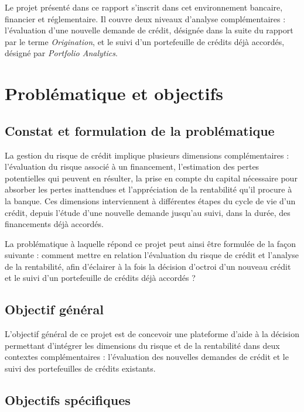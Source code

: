 Le projet présenté dans ce rapport s'inscrit dans cet environnement bancaire, financier et réglementaire. Il couvre deux niveaux d'analyse complémentaires : l'évaluation d'une nouvelle demande de crédit, désignée dans la suite du rapport par le terme \emph{Origination}, et le suivi d'un portefeuille de crédits déjà accordés, désigné par \emph{Portfolio Analytics}.

\section{Problématique et objectifs}

\subsection{Constat et formulation de la problématique}

La gestion du risque de crédit implique plusieurs dimensions complémentaires : l'évaluation du risque associé à un financement, l'estimation des pertes potentielles qui peuvent en résulter, la prise en compte du capital nécessaire pour absorber les pertes inattendues et l'appréciation de la rentabilité qu'il procure à la banque. Ces dimensions interviennent à différentes étapes du cycle de vie d'un crédit, depuis l'étude d'une nouvelle demande jusqu'au suivi, dans la durée, des financements déjà accordés.

La problématique à laquelle répond ce projet peut ainsi être formulée de la façon suivante : comment mettre en relation l'évaluation du risque de crédit et l'analyse de la rentabilité, afin d'éclairer à la fois la décision d'octroi d'un nouveau crédit et le suivi d'un portefeuille de crédits déjà accordés ?

\subsection{Objectif général}

L'objectif général de ce projet est de concevoir une plateforme d'aide à la décision permettant d'intégrer les dimensions du risque et de la rentabilité dans deux contextes complémentaires : l'évaluation des nouvelles demandes de crédit et le suivi des portefeuilles de crédits existants.

\subsection{Objectifs spécifiques}

